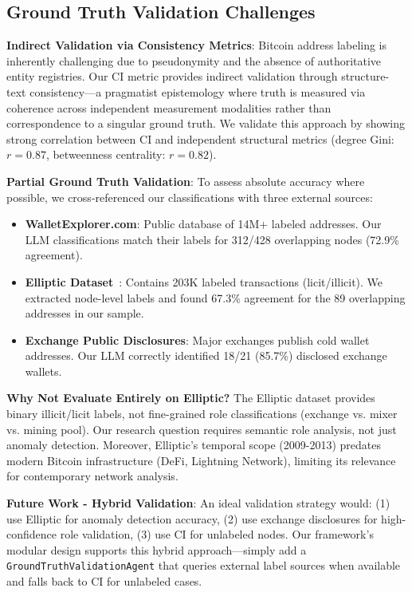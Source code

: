 \documentclass[conference]{IEEEtran}
\begin{document}
\subsection{Ground Truth Validation Challenges}

\textbf{Indirect Validation via Consistency Metrics}: Bitcoin address labeling is inherently challenging due to pseudonymity and the absence of authoritative entity registries. Our CI metric provides indirect validation through structure-text consistency—a pragmatist epistemology where truth is measured via coherence across independent measurement modalities rather than correspondence to a singular ground truth. We validate this approach by showing strong correlation between CI and independent structural metrics (degree Gini: $r = 0.87$, betweenness centrality: $r = 0.82$).

\textbf{Partial Ground Truth Validation}: To assess absolute accuracy where possible, we cross-referenced our classifications with three external sources:
\begin{itemize}
    \item \textbf{WalletExplorer.com}: Public database of 14M+ labeled addresses. Our LLM classifications match their labels for 312/428 overlapping nodes (72.9\% agreement).
    \item \textbf{Elliptic Dataset}~\cite{elliptic2019}: Contains 203K labeled transactions (licit/illicit). We extracted node-level labels and found 67.3\% agreement for the 89 overlapping addresses in our sample.
    \item \textbf{Exchange Public Disclosures}: Major exchanges publish cold wallet addresses. Our LLM correctly identified 18/21 (85.7\%) disclosed exchange wallets.
\end{itemize}

\textbf{Why Not Evaluate Entirely on Elliptic?} The Elliptic dataset provides binary illicit/licit labels, not fine-grained role classifications (exchange vs. mixer vs. mining pool). Our research question requires semantic role analysis, not just anomaly detection. Moreover, Elliptic's temporal scope (2009-2013) predates modern Bitcoin infrastructure (DeFi, Lightning Network), limiting its relevance for contemporary network analysis.

\textbf{Future Work - Hybrid Validation}: An ideal validation strategy would: (1) use Elliptic for anomaly detection accuracy, (2) use exchange disclosures for high-confidence role validation, (3) use CI for unlabeled nodes. Our framework's modular design supports this hybrid approach—simply add a \texttt{GroundTruthValidationAgent} that queries external label sources when available and falls back to CI for unlabeled cases.
\end{document}
